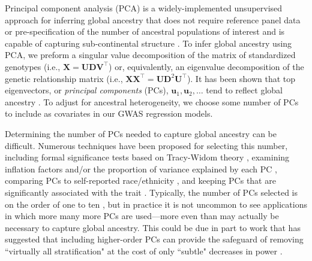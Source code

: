 \documentclass[12pt]{article}
\begin{document}
Principal component analysis (PCA) is a widely-implemented unsupervised approach for inferring global ancestry that does not require reference panel data or pre-specification of the number of ancestral populations of interest and is capable of capturing sub-continental structure \citep{novembre2008}. 
To infer global ancestry using PCA, we preform a singular value decomposition of the matrix of standardized genotypes (i.e., $\mathbf{X} = \mathbf{U}\mathbf{D}\mathbf{V}^\top$) or, equivalently, an eigenvalue decomposition of the genetic relationship matrix (i.e., $\mathbf{X}\mathbf{X}^\top = \mathbf{U}\mathbf{D}^2\mathbf{U}^\top$).
It has been shown that top eigenvectors, or \textit{principal components} (PCs), $\mathbf{u}_1, \mathbf{u}_2, \dots$ tend to reflect global ancestry \citep{patterson2006, mcvean2009}.
To adjust for ancestral heterogeneity, we choose some number of PCs %
to include as covariates in our GWAS regression models. 

Determining the number of PCs needed to capture global ancestry can be difficult. 
Numerous techniques have been proposed for selecting this number, including formal significance tests based on Tracy-Widom theory \citep{patterson2006, eigenstrat}, examining inflation factors \citep{reed2015, conomos2016} and/or the proportion of variance explained by each PC \citep{raska2012, reed2015, conomos2016}, comparing PCs to self-reported race/ethnicity \citep{conomos2016}, and keeping PCs that are significantly associated with the trait \citep{reiner2012, daya2019}.
Typically, the number of PCs selected is on the order of one to ten \citep{abegaz2019}, but in practice it is not uncommon to see applications in which more many more PCs are used---more even than may actually be necessary to capture global ancestry. 
This could be due in part to work that has suggested that including higher-order PCs can provide the safeguard of removing ``virtually all stratification" \citep{mathieson2012} at the cost of only ``subtle" decreases in power \citep{liu2011}.
\end{document}
